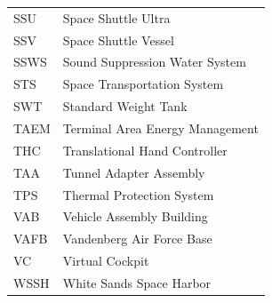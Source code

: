 \documentclass[Space_Shuttle_Vessel_Manual.tex]{subfiles}
\begin{document}
\begin{longtable}{l l }
SSU & Space Shuttle Ultra\\
SSV & Space Shuttle Vessel\\
SSWS & Sound Suppression Water System\\
STS & Space Transportation System\\
SWT & Standard Weight Tank\\
TAEM & Terminal Area Energy Management\\
THC & Translational Hand Controller\\
TAA & Tunnel Adapter Assembly\\
TPS & Thermal Protection System\\
VAB & Vehicle Assembly Building\\
VAFB & Vandenberg Air Force Base\\
VC & Virtual Cockpit\\
WSSH & White Sands Space Harbor\\
\end{longtable}
\end{document}
